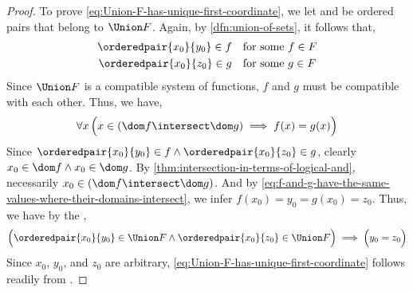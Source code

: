 \begin{proof}
    \vspace{0.3cm}
    \noindent
    To prove \eqref{eq:Union-F-has-unique-first-coordinate}, we let  and  be
    ordered pairs that belong to \( \Union F \). Again, by \cref{dfn:union-of-sets}, it follows that,
    \begin{equation*}
        \begin{aligned}
            \orderedpair{x_{0}}{y_{0}} \in f& \\
            \orderedpair{x_{0}}{z_{0}} \in g&
        \end{aligned}
        \begin{aligned}
            &\quad\text{for some \( f \in F \)}\\
            &\quad\text{for some \( g \in F \)}
        \end{aligned}
    \end{equation*}
    Since \( \Union F \) is a compatible system of functions, \( f \) and \( g \) must be compatible with each other.
    Thus, we have,
    \begin{equation}
        \label{eq:f-and-g-have-the-same-values-where-their-domains-intersect}
        \forall x \, \Big( x \in \mleft( \dom f \intersect \dom g \mright) \implies f(x) = g(x) \Big)
    \end{equation}
    Since \( \orderedpair{x_{0}}{y_{0}} \in f \land \orderedpair{x_{0}}{z_{0}} \in g \), clearly \( x_{0} \in \dom f \land x_{0} \in \dom g \).
    By \cref{thm:intersection-in-terms-of-logical-and}, necessarily \( x_{0} \in \mleft( \dom f \intersect \dom g \mright) \).
    And by \eqref{eq:f-and-g-have-the-same-values-where-their-domains-intersect}, we infer \( f(x_{0}) = y_{0} = g(x_{0}) = z_{0} \).
    Thus, we have by the ,
    \begin{equation*}
        \Big( \orderedpair{x_{0}}{y_{0}} \in \Union F \land \orderedpair{x_{0}}{z_{0}} \in \Union F \Big) \implies \Big( y_{0} = z_{0} \Big)
    \end{equation*}
    Since \( x_{0} \), \( y_{0} \), and \( z_{0} \) are arbitrary, \eqref{eq:Union-F-has-unique-first-coordinate} follows readily from
    .


\end{proof}
